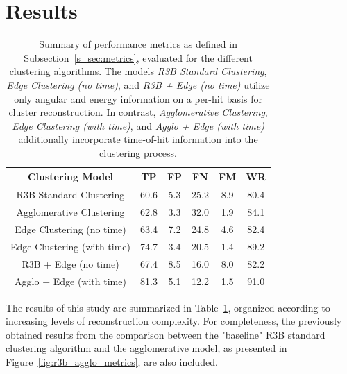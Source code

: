 \documentclass[final,5p,times,twocolumn]{elsarticle}
\begin{document}
\section{Results}\label{sec:results}
\begin{table}[h!]
\begin{center}
\begin{tabular}{||c| c| c |c | c|| c|}
 \hline
 Clustering Model & TP & FP & FN & FM & WR \\ [0.5ex] 
 \hline\hline
 R3B Standard Clustering & 60.6 & 5.3 & 25.2 & 8.9 & 80.4 \\ 
 \hline
 Agglomerative Clustering & 62.8 & 3.3 & 32.0 & 1.9 & 84.1 \\ 
 \hline
 Edge Clustering (no time) & 63.4 & 7.2 & 24.8 & 4.6 & 82.4 \\ 
 \hline
 Edge Clustering (with time) & 74.7 & 3.4 & 20.5 & 1.4 & 89.2 \\ 
 \hline
 R3B + Edge (no time) & 67.4 & 8.5 & 16.0 & 8.0 & 82.2 \\ 
 \hline
 Agglo + Edge (with time) & 81.3 & 5.1 & 12.2 & 1.5 & 91.0 \\
 \hline
\end{tabular}
\end{center}
\caption{Summary of performance metrics as defined in Subsection~\ref{s_sec:metrics}, evaluated for the different clustering algorithms. The models \textit{R3B Standard Clustering}, \textit{Edge Clustering (no time)}, and \textit{R3B + Edge (no time)} utilize only angular and energy information on a per-hit basis for cluster reconstruction. In contrast, \textit{Agglomerative Clustering}, \textit{Edge Clustering (with time)}, and \textit{Agglo + Edge (with time)} additionally incorporate time-of-hit information into the clustering process.}
\label{tab:results}
\end{table}
The results of this study are summarized in Table~\ref{tab:results}, organized according to increasing levels of reconstruction complexity. For completeness, the previously obtained results from the comparison between the "baseline" R3B standard clustering algorithm and the agglomerative model, as presented in Figure~\ref{fig:r3b_agglo_metrics}, are also included.\newline
\end{document}
